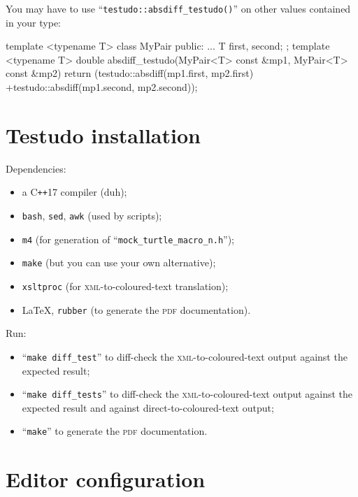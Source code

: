 \documentclass[twoside, a4paper, article]{memoir}
\newcommand*\Cpp{C\texttt{++}}
\begin{document}
You may have to use ``\texttt{testudo::absdiff\_testudo()}'' on other values
contained in your type:
\begin{cpplisting}
template <typename T>
class MyPair {
public:
  ...
  T first, second;
};
template <typename T>
double absdiff_testudo(MyPair<T> const &mp1,
                       MyPair<T> const &mp2) {
  return (testudo::absdiff(mp1.first, mp2.first)
          +testudo::absdiff(mp1.second, mp2.second));
}
\end{cpplisting}


\cleartooddpage

\appendices

\chapter{Testudo installation}
\label{cha:testudo-installation}

Dependencies:
\begin{itemize}
\item a \Cpp{}17 compiler (duh);
\item \texttt{bash}, \texttt{sed}, \texttt{awk} (used by scripts);
\item \texttt{m4} (for generation of ``\texttt{mock\_turtle\_macro\_n.h}'');
\item \texttt{make} (but you can use your own alternative);
\item \texttt{xsltproc} (for \textsc{xml}-to-coloured-text translation);
\item \LaTeX{}, \texttt{rubber} (to generate the \textsc{pdf} documentation).
\end{itemize}

Run:
\begin{itemize}
\item ``\texttt{make diff\_test}'' to diff-check the
  \textsc{xml}-to-coloured-text output against the expected result;
\item ``\texttt{make diff\_tests}'' to diff-check the
  \textsc{xml}-to-coloured-text output against the expected result and against
  direct-to-coloured-text output;
\item ``\texttt{make}'' to generate the \textsc{pdf} documentation.
\end{itemize}


\chapter{Editor configuration}
\label{cha:editor-configuration}
\end{document}
